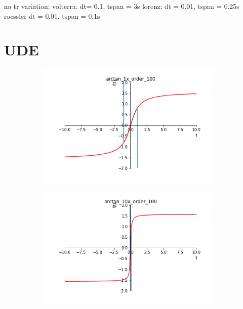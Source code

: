 \documentclass[arbeit=studie,oneside,BCOR=12mm]{ArbeitRST}
\begin{document}
no tr variation:
volterra: dt= 0.1, tspan = 3s
lorenz: dt = 0.01, tspan = 0.25s
roessler dt = 0.01, tspan = 0.1s

\section{UDE}

\begin{figure}[ht]
\begin{subfigure}[c]{0.5\textwidth}
\centering
\includegraphics[width=1\textwidth]{images/arctan_1x_order_100}

\end{subfigure}
\begin{subfigure}[c]{0.5\textwidth}
\centering
\includegraphics[width=1\textwidth]{images/arctan_10x_order_100}


\end{subfigure}
\end{figure}
\end{document}
